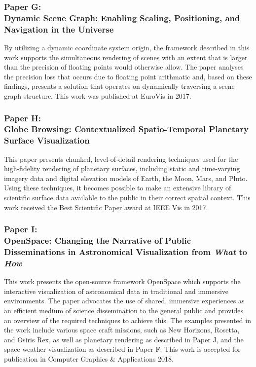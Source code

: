 \subsubsection{Paper G:\\Dynamic Scene Graph: Enabling Scaling, Positioning, and Navigation in the Universe}
By utilizing a dynamic coordinate system origin, the framework described in this work supports the simultaneous rendering of scenes with an extent that is larger than the precision of floating points would otherwise allow.  The paper analyses the precision loss that occurs due to floating point arithmatic and, based on these findings, presents a solution that operates on dynamically traversing a scene graph structure.  This work was published at EuroVis in 2017.

\subsubsection{Paper H:\\Globe Browsing: Contextualized Spatio-Temporal Planetary Surface Visualization}
This paper presents chunked, level-of-detail rendering techniques used for the high-fidelity rendering of planetary surfaces, including static and time-varying imagery data and digital elevation models of Earth, the Moon, Mars, and Pluto.  Using these techniques, it becomes possible to make an extensive library of scientific surface data available to the public in their correct spatial context.  This work received the Best Scientific Paper award at IEEE Vis in 2017.

\subsubsection{Paper I:\\OpenSpace: Changing the Narrative of Public Disseminations in Astronomical Visualization from \emph{What} to \emph{How}}
This work presents the open-source framework OpenSpace which supports the interactive visualization of astronomical data in traditional and immersive environments.  The paper advocates the use of shared, immersive experiences as an efficient medium of science dissemination to the general public and provides an overview of the required techniques to achieve this.  The examples presented in the work include various space craft missions, such as New Horizons, Rosetta, and Osiris Rex, as well as planetary rendering as described in Paper J, and the space weather visualization as described in Paper F.  This work is accepted for publication in Computer Graphics \& Applications 2018.
